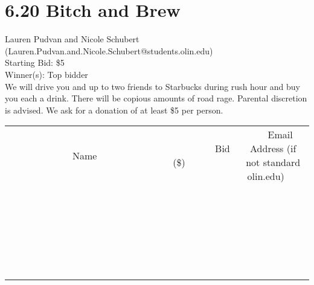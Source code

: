 \documentclass[11pt]{article}
\begin{document}
\section*{6.20 Bitch and Brew}
Lauren Pudvan and Nicole Schubert (Lauren.Pudvan.and.Nicole.Schubert@students.olin.edu) \\
Starting Bid: \$5 \\
Winner(s): 
Top bidder \\
We will drive you and up to two friends to Starbucks during rush hour and buy you each a drink. There will be copious amounts of road rage. Parental discretion is advised.
We ask for a donation of at least \$5 per person. \\[6ex]
\begin{tabular}{c c c}
~~~~~~~~~~~~~Name~~~~~~~~~~~~~ & ~~~~~~~~~Bid (\$)~~~~~~~~~ & ~~~Email Address (if not standard olin.edu)~~~ \\
 & & \\
\hline
 & & \\
\hline
 & & \\
\hline
 & & \\
\hline
 & & \\
\hline
 & & \\
\hline
 & & \\
\hline
 & & \\
\hline
 & & \\
\hline
 & & \\
\hline
 & & \\
\hline
 & & \\
\hline
 & & \\
\hline
 & & \\
\hline
 & & \\
\hline
 & & \\
\hline
 & & \\
\hline
 & & \\
\hline
 & & \\
\hline
 & & \\
\hline
 & & \\
\hline
 & & \\
\hline
 & & \\
\hline
 & & \\
\hline
 & & \\
\hline
 & & \\
\hline
\end{tabular}
\clearpage
\end{document}

